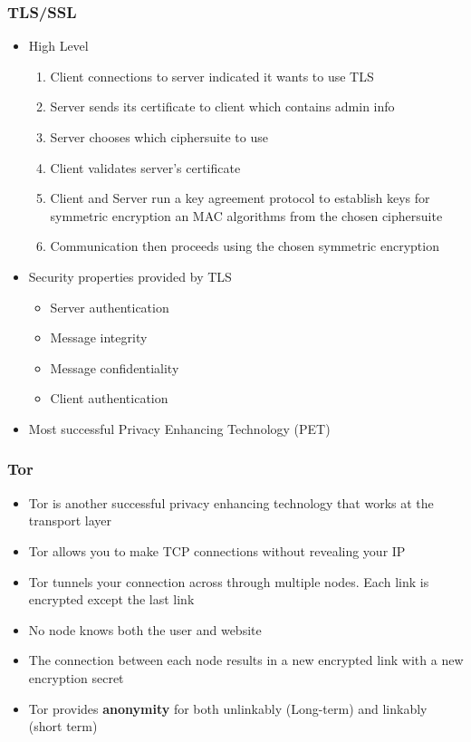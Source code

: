 \documentclass[twoside]{article}
\begin{document}
\subsubsection{TLS/SSL}
\begin{itemize}
\item High Level
\begin{enumerate}
\item Client connections to server indicated it wants to use TLS
\item Server sends its certificate to client which contains admin info
\item Server chooses which ciphersuite to use
\item Client validates server's certificate
\item Client and Server run a key agreement protocol to establish keys for symmetric encryption an MAC algorithms from the chosen ciphersuite
\item Communication then proceeds using the chosen symmetric encryption
\end{enumerate}
\item Security properties provided by TLS
\begin{itemize}
\item Server authentication
\item Message integrity
\item Message confidentiality 
\item Client authentication 
\end{itemize}
\item Most successful Privacy Enhancing Technology (PET)
\end{itemize}


\subsubsection{Tor}
\begin{itemize}
\item Tor is another successful privacy enhancing technology that works at the transport layer
\item Tor allows you to make TCP connections without revealing your IP
\item Tor tunnels your connection across through multiple nodes. Each link is encrypted except the last link
\item No node knows both the user and website 
\item The connection between each node results in a new encrypted link with a new encryption secret
\item Tor provides \textbf{anonymity} for both unlinkably (Long-term) and linkably (short term) 
\end{itemize}
\end{document}

